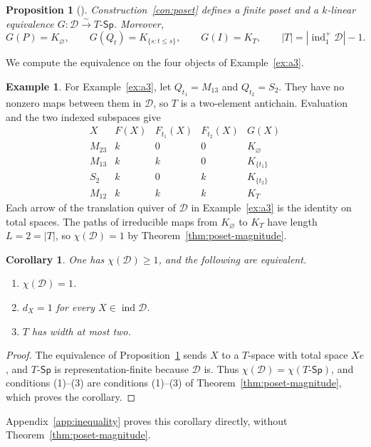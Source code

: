 \documentclass[a4paper,reqno,10pt]{amsart}
\newtheorem{proposition}[theorem]{Proposition}
\newtheorem{corollary}[theorem]{Corollary}
\theoremstyle{definition}
\newtheorem{example}[theorem]{Example}
\numberwithin{equation}{section}
\DeclareMathOperator{\ind}{ind}
\newcommand{\cD}{\mathcal D}
\newcommand{\TSp}{T\text{-}\mathsf{Sp}}
\begin{document}
\begin{proposition}[{\cite[Section~10, Theorem, p.~243]{RV}}]\label{prop:poset-equivalence}
Construction~\ref{con:poset} defines a finite poset and a \(k\)-linear
equivalence \(G:\cD\xrightarrow{\sim}\TSp\). Moreover,
\[
 G(P)=K_\varnothing,\qquad G(Q_t)=K_{\{s:t\leq s\}},\qquad G(I)=K_T,
 \qquad |T|=|\ind_1^+\cD|-1.
\]
\end{proposition}
We compute the equivalence on the four objects of Example~\ref{ex:a3}.
\begin{example}\label{ex:a3-poset}
For Example~\ref{ex:a3}, let \(Q_{t_1}=M_{13}\) and \(Q_{t_2}=S_2\).
They have no nonzero maps between them in \(\cD\), so \(T\) is a
two-element antichain. Evaluation and the two indexed subspaces give
\[
\begin{array}{c|ccc|c}
 X&F(X)&F_{t_1}(X)&F_{t_2}(X)&G(X)\\\hline
 M_{23}&k&0&0&K_\varnothing\\
 M_{13}&k&k&0&K_{\{t_1\}}\\
 S_2&k&0&k&K_{\{t_2\}}\\
 M_{12}&k&k&k&K_T
\end{array}
\]
Each arrow of the translation quiver of \(\cD\) in Example~\ref{ex:a3}
is the identity on total spaces.
The paths of irreducible maps from \(K_\varnothing\) to \(K_T\) have length
\(L=2=|T|\), so \(\chi(\cD)=1\) by Theorem~\ref{thm:poset-magnitude}.
\end{example}


\begin{corollary}\label{prop:intrinsic}
One has \(\chi(\cD)\geq1\), and the following are equivalent.
\begin{enumerate}
\item \(\chi(\cD)=1\).
\item \(d_X=1\) for every \(X\in\ind\cD\).
\item \(T\) has width at most two.
\end{enumerate}
\end{corollary}
\begin{proof}
The equivalence of Proposition~\ref{prop:poset-equivalence} sends \(X\) to
a \(T\)-space with total space \(Xe\), and \(\TSp\) is
representation-finite because \(\cD\) is. Thus \(\chi(\cD)=\chi(\TSp)\), and
conditions (1)--(3) are conditions (1)--(3) of
Theorem~\ref{thm:poset-magnitude}, which proves the corollary.
\end{proof}
Appendix~\ref{app:inequality} proves this corollary directly, without
Theorem~\ref{thm:poset-magnitude}.
\end{document}
